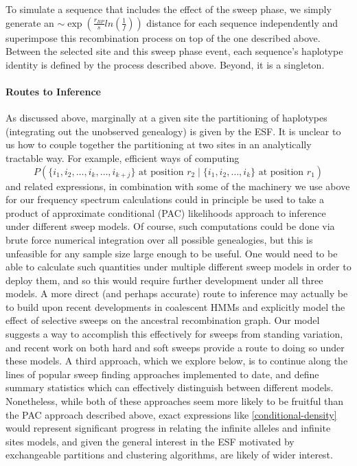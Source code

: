 \documentclass[a4paper,10pt]{article}
\begin{document}
To simulate a sequence that includes the effect of the sweep phase, we simply generate an $\sim \exp\left(\frac{r_{BP}}{s}ln\left(\frac{1}{f}\right)\right)$ distance for each sequence independently and superimpose this recombination process on top of the one described above. Between the selected site and this sweep phase event, each sequence's haplotype identity is defined by the process described above. Beyond, it is a singleton.

\paragraph{Routes to Inference}
As discussed above, marginally at a given site the partitioning of haplotypes (integrating out the unobserved genealogy) is given by the ESF. It is unclear to us how to couple together the partitioning at two sites in an analytically tractable way. For example, efficient ways of computing 
\begin{equation}
	P\left(\{i_1,i_2,\dots,i_k,\dots,i_{k+j}\} \text{ at position } r_2 \mid \{i_1,i_2,\dots,i_k\} \text{ at position } r_1 \right) \label{conditional-density}
\end{equation}
and related expressions, in combination with some of the machinery we use above for our frequency spectrum calculations could in principle be used to take a product of approximate conditional (PAC) likelihoods approach to inference under different sweep models. Of course, such computations could be done via brute force numerical integration over all possible genealogies, but this is unfeasible for any sample size large enough to be useful. One would need to be able to calculate such quantities under multiple different sweep models in order to deploy them, and so this would require further development under all three models. A more direct (and perhaps accurate) route to inference may actually be to build upon recent developments in coalescent HMMs \citep{Li2011,Paul:2011gv,Sheehan:2013ib,Rasmussen:2014gj} and explicitly model the effect of selective sweeps on the ancestral recombination graph. Our model suggests a way to accomplish this effectively for sweeps from standing variation, and recent work on both hard and soft sweeps \citep{Barton1998,Durrett:2004fl,Durrett:2005fr,Schweinsberg:2005eh,Etheridge:2006fk,Hermisson2008,Messer:2012ie} provide a route to doing so under these models. A third approach, which we explore below, is to continue along the lines of popular sweep finding approaches implemented to date, and define summary statistics which can effectively distinguish between different models. Nonetheless, while both of these approaches seem more likely to be fruitful than the PAC approach described above, exact expressions like \eqref{conditional-density} would represent significant progress in relating the infinite alleles and infinite sites models, and given the general interest in the ESF motivated by exchangeable partitions and clustering algorithms, are likely of wider interest.
 
\end{document}

